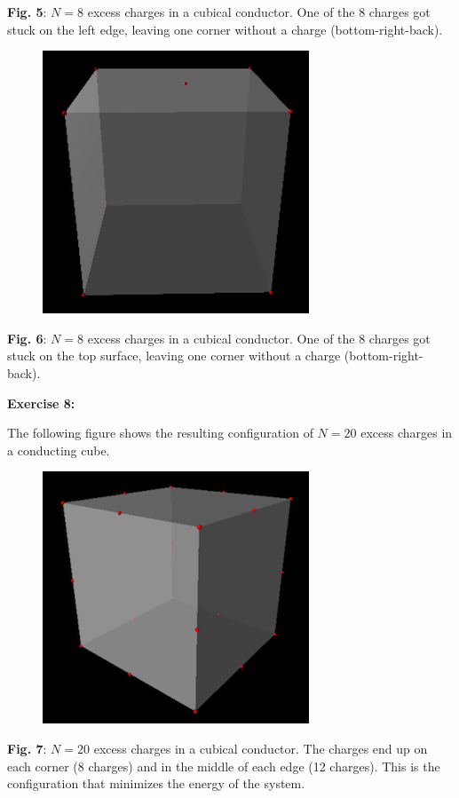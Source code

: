 \documentclass[]{article}
\begin{document}
\textbf{Fig. 5}: \(N = 8\) excess charges in a cubical conductor. One of
the 8 charges got stuck on the left edge, leaving one corner without a
charge (bottom-right-back).

\begin{figure}[htbp]
\centering
\includegraphics{images/cube_8_surface.png}
\caption{}
\end{figure}

\textbf{Fig. 6}: \(N = 8\) excess charges in a cubical conductor. One of
the 8 charges got stuck on the top surface, leaving one corner without a
charge (bottom-right-back).

\textbf{Exercise 8:}

The following figure shows the resulting configuration of \(N=20\)
excess charges in a conducting cube.

\begin{figure}[htbp]
\centering
\includegraphics{images/cube_20.png}
\caption{}
\end{figure}

\textbf{Fig. 7}: \(N = 20\) excess charges in a cubical conductor. The
charges end up on each corner (8 charges) and in the middle of each edge
(12 charges). This is the configuration that minimizes the energy of the
system.
\end{document}

